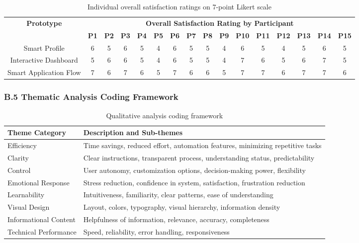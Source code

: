 \documentclass[
	letterpaper, %
]{jdf}
\begin{document}
\begin{sloppypar}
\begin{table}[h]
\centering
\begin{tabular}{|c|c|c|c|c|c|c|c|c|c|c|c|c|c|c|c|}
\hline
\multirow{2}{*}{\textbf{Prototype}} & \multicolumn{15}{c|}{\textbf{Overall Satisfaction Rating by Participant}} \\
\cline{2-16}
 & \textbf{P1} & \textbf{P2} & \textbf{P3} & \textbf{P4} & \textbf{P5} & \textbf{P6} & \textbf{P7} & \textbf{P8} & \textbf{P9} & \textbf{P10} & \textbf{P11} & \textbf{P12} & \textbf{P13} & \textbf{P14} & \textbf{P15} \\
\hline
Smart Profile & 6 & 5 & 6 & 5 & 4 & 6 & 5 & 5 & 4 & 6 & 5 & 4 & 5 & 6 & 5 \\
\hline
Interactive Dashboard & 5 & 6 & 6 & 5 & 4 & 6 & 5 & 5 & 4 & 7 & 6 & 5 & 6 & 7 & 5 \\
\hline
Smart Application Flow & 7 & 6 & 7 & 6 & 5 & 7 & 6 & 6 & 5 & 7 & 7 & 6 & 7 & 7 & 6 \\
\hline
\end{tabular}
\caption{Individual overall satisfaction ratings on 7-point Likert scale}
\end{table}

\subsubsection{B.5 Thematic Analysis Coding Framework}

\begin{table}[h]
\centering
\begin{tabular}{|l|p{10cm}|}
\hline
\textbf{Theme Category} & \textbf{Description and Sub-themes} \\
\hline
Efficiency & Time savings, reduced effort, automation features, minimizing repetitive tasks \\
\hline
Clarity & Clear instructions, transparent process, understanding status, predictability \\
\hline
Control & User autonomy, customization options, decision-making power, flexibility \\
\hline
Emotional Response & Stress reduction, confidence in system, satisfaction, frustration reduction \\
\hline
Learnability & Intuitiveness, familiarity, clear patterns, ease of understanding \\
\hline
Visual Design & Layout, colors, typography, visual hierarchy, information density \\
\hline
Informational Content & Helpfulness of information, relevance, accuracy, completeness \\
\hline
Technical Performance & Speed, reliability, error handling, responsiveness \\
\hline
\end{tabular}
\caption{Qualitative analysis coding framework}
\end{table}


\end{sloppypar}
\end{document}
